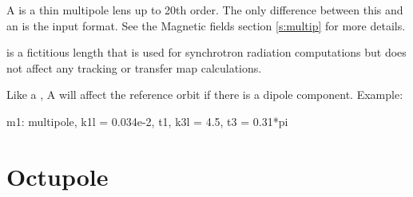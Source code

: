 {{A  is a thin multipole lens up to 20th order. The only
difference between this and an  is the input format. See the 
Magnetic fields section \ref{s:multip} for more details.

 is a fictitious length that is used for synchrotron radiation
computations but does not affect any tracking or transfer map calculations. 

Like a \mad {}, A \bmad {} will affect the
reference orbit if there is a dipole component. 
Example:
\begin{example}
  m1: multipole, k1l = 0.034e-2, t1, k3l = 4.5, t3 = 0.31*pi
\end{example}

\section{Octupole}
\label{s:oct}

}}
